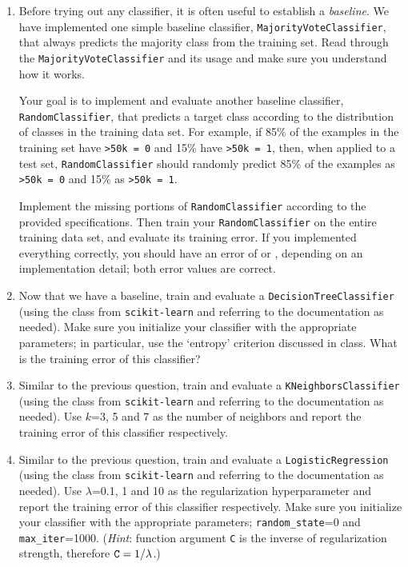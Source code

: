 \documentclass[11pt]{article}
\begin{document}
\begin{enumerate}[resume]

\item {} Before trying out any classifier, it is often useful to establish a \emph{baseline}. We have implemented one simple baseline classifier, \verb|MajorityVoteClassifier|, that always predicts the majority class from the training set. Read through the \verb|MajorityVoteClassifier| and its usage and make sure you understand how it works.

Your goal is to implement and evaluate another baseline classifier, \verb|RandomClassifier|, that predicts a target class according to the distribution of classes in the training data set. For example, if 85\% of the examples in the training set have \verb|>50k = 0| and 15\% have \verb|>50k = 1|, then, when applied to a test set, \verb|RandomClassifier| should randomly predict 85\% of the examples as \verb|>50k = 0| and 15\% as \verb|>50k = 1|.

Implement the missing portions of \verb|RandomClassifier| according to the provided specifications. Then train your \verb|RandomClassifier| on the entire training data set, and evaluate its training error. If you implemented everything correctly, you should have an error of {\color{red}{$0.385$}} or {\color{red}{$0.374$}}, depending on an implementation detail; both error values are correct. \newpage

\item {} Now that we have a baseline, train and evaluate a \verb|DecisionTreeClassifier| (using the class from \verb|scikit-learn| and referring to the documentation as needed). Make sure you initialize your classifier with the appropriate parameters; in particular, use the `entropy' criterion discussed in class. What is the training error of this classifier? \vspace{4cm}

\item {} Similar to the previous question, train and evaluate a \verb|KNeighborsClassifier| (using the class from \verb|scikit-learn| and referring to the documentation as needed). Use $k$=3, 5 and 7 as the number of neighbors and report the training error of this classifier respectively. \vspace{6cm}

\item {} Similar to the previous question, train and evaluate a \verb|LogisticRegression| (using the class from \verb|scikit-learn| and referring to the documentation as needed). Use $\lambda$=0.1, 1 and 10 as the regularization hyperparameter and report the training error of this classifier respectively.  Make sure you initialize your classifier with the appropriate parameters; \verb|random_state|=0 and \verb|max_iter|=1000. (\emph{Hint}: function argument \verb|C| is the inverse of regularization strength, therefore $\verb|C| = 1 / \lambda$.)  \vspace{6cm}


\end{enumerate}
\end{document}
